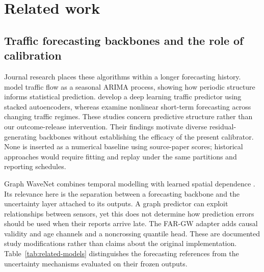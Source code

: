 \documentclass[pdflatex,sn-mathphys-num]{sn-jnl}
\newcounter{algorithm}
\begin{document}
\section{Related work}\label{sec:related}
\subsection{Traffic forecasting backbones and the role of calibration}
Journal research places these algorithms within a longer forecasting history. \citet{williams2003} model traffic flow as a seasonal ARIMA process, showing how periodic structure informs statistical prediction. \citet{lv2015} develop a deep learning traffic predictor using stacked autoencoders, whereas \citet{polson2017} examine nonlinear short-term forecasting across changing traffic regimes. These studies concern predictive structure rather than our outcome-release intervention. Their findings motivate diverse residual-generating backbones without establishing the efficacy of the present calibrator. None is inserted as a numerical baseline using source-paper scores; historical approaches would require fitting and replay under the same partitions and reporting schedules.

Graph WaveNet combines temporal modelling with learned spatial dependence \citep{wu2019}. Its relevance here is the separation between a forecasting backbone and the uncertainty layer attached to its outputs. A graph predictor can exploit relationships between sensors, yet this does not determine how prediction errors should be used when their reports arrive late. The FAR-GW adapter adds causal validity and age channels and a noncrossing quantile head. These are documented study modifications rather than claims about the original implementation. Table~\ref{tab:related-models} distinguishes the forecasting references from the uncertainty mechanisms evaluated on their frozen outputs.
\end{document}
